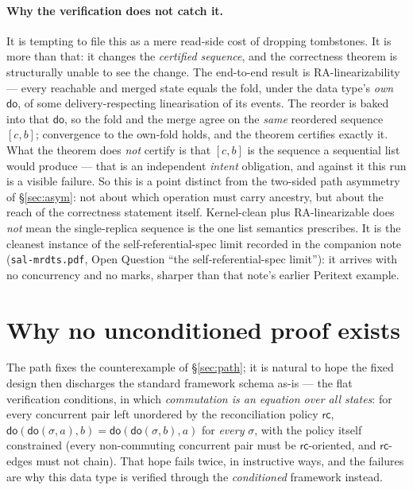 \documentclass[11pt]{article}
\newcommand{\rc}{\mathsf{rc}}
\newcommand{\doo}{\mathsf{do}}
\begin{document}
\paragraph{Why the verification does not catch it.} It is tempting to file this as
a mere read-side cost of dropping tombstones. It is more than that: it changes the
\emph{certified sequence}, and the correctness theorem is structurally unable to
see the change. The end-to-end result is RA-linearizability --- every reachable and
merged state equals the fold, under the data type's \emph{own} $\doo$, of some
delivery-respecting linearisation of its events. The reorder is baked into that
$\doo$, so the fold and the merge agree on the \emph{same} reordered sequence
$[c,b]$; convergence to the own-fold holds, and the theorem certifies exactly it.
What the theorem does \emph{not} certify is that $[c,b]$ is the sequence a
sequential list would produce --- that is an independent \emph{intent} obligation,
and against it this run is a visible failure. So this is a point distinct from the
two-sided path asymmetry of \S\ref{sec:asym}: not about which operation must carry
ancestry, but about the reach of the correctness statement itself. Kernel-clean
plus RA-linearizable does \emph{not} mean the single-replica sequence is the one
list semantics prescribes. It is the cleanest instance of the self-referential-spec
limit recorded in the companion note (\texttt{sal-mrdts.pdf}, Open Question
``the self-referential-spec limit''): it arrives with no concurrency and no marks,
sharper than that note's earlier Peritext example.

\section{Why no unconditioned proof exists}
\label{sec:uncond}

The path fixes the counterexample of \S\ref{sec:path}; it is natural to hope the
fixed design then discharges the standard framework schema as-is --- the flat
verification conditions, in which \emph{commutation is an equation over all
states}: for every concurrent pair left unordered by the reconciliation policy
$\rc$, $\doo(\doo(\sigma,a),b) = \doo(\doo(\sigma,b),a)$ for \emph{every}
$\sigma$, with the policy itself constrained (every non-commuting concurrent
pair must be $\rc$-oriented, and $\rc$-edges must not chain). That hope fails
twice, in instructive ways, and the failures are why this data type is verified
through the \emph{conditioned} framework instead.
\end{document}
